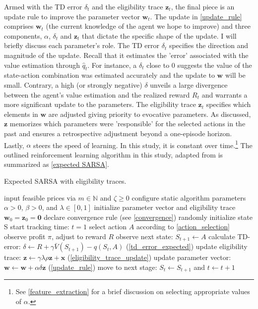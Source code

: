 Armed with the TD error $\delta_t$ and the eligibility trace $\boldsymbol{z}_t$, the final piece is an update rule to improve the parameter vector $\boldsymbol{w}_t$. The update in \autoref{update_rule} comprises $\boldsymbol{w}_t$  (the current knowledge of the agent we hope to improve) and three components, $\alpha$, $\delta_t$ and $\boldsymbol{z}_t$ that dictate the specific shape of the update. I will briefly discuss each parameter's role. The TD error $\delta_t$ specifies the direction and magnitude of the update. Recall that it estimates the 'error' associated with the value estimation through $\hat{q}_t$. For instance, a $\delta_t$ close to 0 suggests the value of the state-action combination was estimated accurately and the update to $\boldsymbol{w}$ will be small. Contrary, a high (or strongly negative) $\delta$ unveils a large divergence between the agent's value estimation and the realized reward $R_t$ and warrants a more significant update to the parameters. The eligibility trace $\boldsymbol{z}_t$ specifies which elements in $\boldsymbol{w}$ are adjusted giving priority to evocative parameters. As discussed, $\boldsymbol{z}$ memorizes which parameters were 'responsible' for the selected actions in the past and ensures a retrospective adjustment beyond a one-episode horizon. Lastly, $\alpha$ steers the speed of learning. In this study, it is constant over time.\footnote{See \autoref{feature_extraction} for a brief discussion on selecting appropriate values of $\alpha$.} The outlined reinforcement learning algorithm in this study, adapted from \textcite{sutton_reinforcement_2018} is summarized as \autoref{expected SARSA}.

\begin{algorithm}
	\caption{Expected SARSA with eligibility traces.}
	\begin{algorithmic}[testing]
		\label{expected SARSA}
		\small
		\STATE input feasible prices via $m \in \mathbb{N}$ and $\zeta \ge 0$
		\STATE configure static algorithm parameters $\alpha > 0$, $\beta > 0$, and $\lambda \in [0, 1]$
		\STATE initialize parameter vector and eligibility trace $\boldsymbol{w}_0 = \boldsymbol{z}_0 = \boldsymbol{0}$
		\STATE declare convergence rule (see \autoref{convergence})
		\STATE randomly initialize state S
		\STATE start tracking time: $t = 1$
		\STATE select action $A$ according to \autoref{action_selection}
		\STATE observe profit $\pi$, adjust to reward $R$
		\STATE observe next state: $S_{t+1} \leftarrow A$
		\STATE calculate TD-error: $\delta \leftarrow R +  \gamma \bar{V}(S_{t+1}) - \hat{q}(S_t, A)$ (\autoref{td_error_expected})
		\STATE update eligibility trace: $\boldsymbol{z} \leftarrow \gamma \lambda \rho \boldsymbol{z} + \boldsymbol{x} $ (\autoref{eligibility_trace_update})
		\STATE update parameter vector: $\boldsymbol{w} \leftarrow \boldsymbol{w} + \alpha  \delta  \boldsymbol{z}$ (\autoref{update_rule})
		\STATE move to next stage: $S_t \leftarrow S_{t+1}$ and $t \leftarrow t+1$
		\ENDWHILE
	\end{algorithmic}
\end{algorithm}

